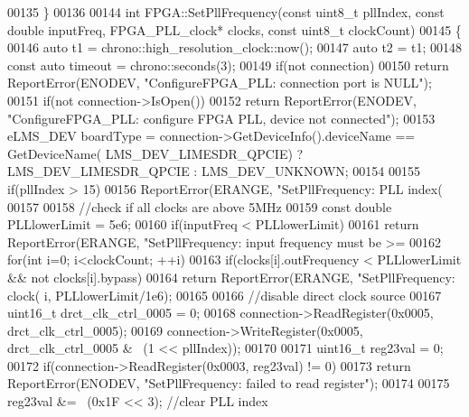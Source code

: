 \begin{DoxyCode}
00135 \}
00136 
00144 \textcolor{keywordtype}{int} FPGA::SetPllFrequency(\textcolor{keyword}{const} uint8\_t pllIndex, \textcolor{keyword}{const} \textcolor{keywordtype}{double} inputFreq, 
      FPGA_PLL_clock* clocks, \textcolor{keyword}{const} uint8\_t clockCount)
00145 \{
00146     \textcolor{keyword}{auto} t1 = chrono::high\_resolution\_clock::now();
00147     \textcolor{keyword}{auto} t2 = t1;
00148     \textcolor{keyword}{const} \textcolor{keyword}{auto} timeout = chrono::seconds(3);
00149     \textcolor{keywordflow}{if}(not connection)
00150         \textcolor{keywordflow}{return} ReportError(ENODEV, \textcolor{stringliteral}{"ConfigureFPGA\_PLL: connection port is NULL"});
00151     \textcolor{keywordflow}{if}(not connection->IsOpen())
00152         \textcolor{keywordflow}{return} ReportError(ENODEV, \textcolor{stringliteral}{"ConfigureFPGA\_PLL: configure FPGA PLL, device not connected"});
00153     eLMS_DEV boardType = connection->GetDeviceInfo().deviceName == GetDeviceName(
      LMS_DEV_LIMESDR_QPCIE) ? LMS_DEV_LIMESDR_QPCIE : LMS_DEV_UNKNOWN;
00154 
00155     \textcolor{keywordflow}{if}(pllIndex > 15)
00156         ReportError(ERANGE, \textcolor{stringliteral}{"SetPllFrequency: PLL index(%
00157 
00158     \textcolor{comment}{//check if all clocks are above 5MHz}
00159     \textcolor{keyword}{const} \textcolor{keywordtype}{double} PLLlowerLimit = 5e6;
00160     \textcolor{keywordflow}{if}(inputFreq < PLLlowerLimit)
00161         \textcolor{keywordflow}{return} ReportError(ERANGE, \textcolor{stringliteral}{"SetPllFrequency: input frequency must be >=%
00162     \textcolor{keywordflow}{for}(\textcolor{keywordtype}{int} i=0; i<clockCount; ++i)
00163         \textcolor{keywordflow}{if}(clocks[i].outFrequency < PLLlowerLimit && not clocks[i].bypass)
00164             \textcolor{keywordflow}{return} ReportError(ERANGE, \textcolor{stringliteral}{"SetPllFrequency: clock(%
      i, PLLlowerLimit/1e6);
00165 
00166     \textcolor{comment}{//disable direct clock source}
00167     uint16\_t drct\_clk\_ctrl\_0005 = 0;
00168     connection->ReadRegister(0x0005, drct\_clk\_ctrl\_0005);
00169     connection->WriteRegister(0x0005, drct\_clk\_ctrl\_0005 & ~(1 << pllIndex));
00170 
00171     uint16\_t reg23val = 0;
00172     \textcolor{keywordflow}{if}(connection->ReadRegister(0x0003, reg23val) != 0)
00173         \textcolor{keywordflow}{return} ReportError(ENODEV, \textcolor{stringliteral}{"SetPllFrequency: failed to read register"});
00174 
00175     reg23val &= ~(0x1F << 3); \textcolor{comment}{//clear PLL index}
}}}
\end{DoxyCode}
